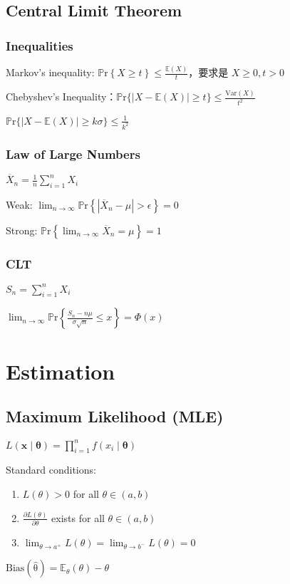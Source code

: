 \documentclass[9pt,landscape]{article}
\begin{document}
\begin{multicols}{3}
\subsection{Central Limit Theorem}

\subsubsection{Inequalities}

Markov's inequality: $\mathbb{P}\mathrm{r}\left\{X\ge t\right\}\le\frac{\mathbb{E}(X)}{t}$，要求是 $X\ge 0, t>0$

Chebyshev's Inequality：$\mathbb{P}\mathrm{r}\{|X-\mathbb{E}(X)|\ge t\}\le\frac{\mathrm{Var}(X)}{t^2}$

$\mathbb{P}\mathrm{r}\{|X-\mathbb{E}(X)|\ge k\sigma\}\le\frac{1}{k^2}$

\subsubsection{Law of Large Numbers}

$\overline{X}_n=\frac{1}{n}\sum_{i=1}^{n}X_i$

Weak: $\lim_{n\to\infty}\mathbb{P}\mathrm{r}\left\{\left|\overline{X}_n-\mu\right|>\epsilon\right\}=0$

Strong: $\mathbb{P}\mathrm{r}\left\{\lim_{n\to\infty}\overline{X}_n=\mu\right\}=1$

\subsubsection{CLT}

$S_n=\sum_{i=1}^{n}X_i$

$\lim_{n\to\infty}\mathbb{P}\mathrm{r}\left\{\frac{S_n-n\mu}{\sigma\sqrt{n}}\le x\right\}=\Phi(x)$

\section{Estimation}

\subsection{Maximum Likelihood (MLE)}

$L(\boldsymbol{x}\mid \boldsymbol{\theta})=\prod_{i=1}^n f(x_i\mid \boldsymbol{\theta})$

Standard conditions:
\begin{enumerate}
	\item $L(\theta)>0$ for all $\theta\in(a, b)$
	\item $\frac{\partial L(\theta)}{\partial\theta}$ exists for all $\theta\in (a, b)$
	\item $\lim_{\theta\to a^+}L(\theta)=\lim_{\theta\to b^-}L(\theta)=0$
\end{enumerate}

$\mathrm{Bias(\hat{\theta})}=\mathbb{E}_\theta(\theta)-\theta$

\end{multicols}
\end{document}

